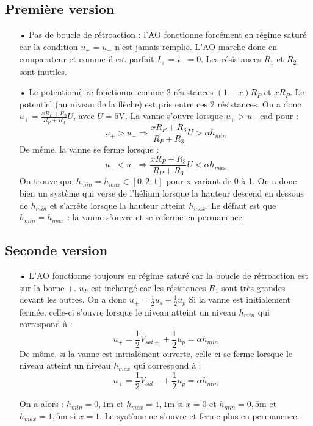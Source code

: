 \documentclass{report}
\begin{document}
\subsection*{Première version}
\begin{itemize}
	\item[•] Pas de boucle de rétroaction : l'AO fonctionne forcément en régime saturé car la condition $u_+=u_-$ n'est jamais remplie. L'AO marche donc en comparateur et comme il est parfait $I_+=i_-=0$. Les résistances $R_1$ et $R_2$ sont inutiles.
	\item[•] Le potentiomètre fonctionne comme 2 résistances $(1-x)R_P$ et $xR_P$. Le potentiel (au niveau de la flèche) est pris entre ces 2 résistances. On a donc $u_+=\frac{xR_P+R_3}{R_P+R_3}U$, avec $U=5$V. La vanne s'ouvre lorsque $u_+>u_-$ cad pour :
	\begin{equation}
		u_+>u_-\Rightarrow\frac{xR_P+R_3}{R_P+R_3}U>\alpha h_{min}
	\end{equation}
	De même, la vanne se ferme lorsque :
	\begin{equation}
		u_+<	u_-\Rightarrow\frac{xR_P+R_3}{R_P+R_3}U<\alpha h_{max}
	\end{equation}
	On trouve que $h_{min}=h_{max}\in\left[ 0,2;1\right] $ pour x variant de 0 à 1.
	On a donc bien un système qui verse de l'hélium lorsque la hauteur descend en dessous de $h_{min}$ et s'arrête lorsque la hauteur atteint $h_{max}$. Le défaut est que $h_{min}=h_{max}$ : la vanne s'ouvre et se referme en permanence.
\end{itemize}

\subsection*{Seconde version}

\begin{itemize}
	\item[•] L'AO fonctionne toujours en régime saturé car la boucle de rétroaction est sur la borne +. $u_P$ est inchangé car les résistances $R_1$ sont très grandes devant les autres. On a donc $u_+=\frac{1}{2}u_s +\frac{1}{2}u_p$
	Si la vanne est initialement fermée, celle-ci s'ouvre lorsque le niveau atteint un niveau $h_{min}$ qui correspond à :
	\begin{equation}
		u_+=\frac{1}{2}V_{sat+} +\frac{1}{2}u_p=\alpha h_{min}
	\end{equation}
De même, si la vanne est initialement ouverte, celle-ci se ferme lorsque le niveau atteint un niveau $h_{max}$ qui correspond à :
	\begin{equation}
		u_+=\frac{1}{2}V_{sat-} +\frac{1}{2}u_p=\alpha h_{min}
	\end{equation}
	
	On a alors : $h_{min}=0,1$m et $h_{max}=1,1$m si $x=0$ et $h_{min}=0,5$m et $h_{max}=1,5$m si $x=1$. Le système ne s'ouvre et ferme plus en permanence.
\end{itemize}
\end{document}
